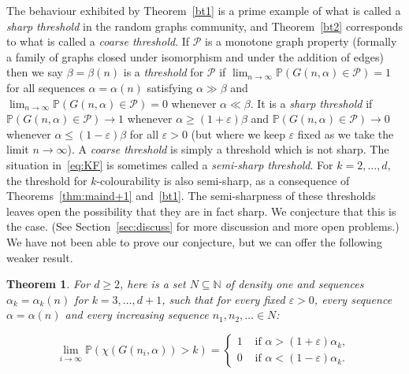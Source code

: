 \documentclass[11pt]{article}%
\newtheorem{theorem}{Theorem} %
\newcommand{\Pcal}[0]{\ensuremath{{\mathcal P}}}
\newcommand{\eN}[0]{\ensuremath{ \mathbb N}}
\newcommand{\Pee}[0]{\ensuremath{{\mathbb P}}}
\newcommand{\eps}{\varepsilon}
\begin{document}
The behaviour exhibited by Theorem~\ref{bt1} is a prime example of what is called a {\em sharp threshold} in the 
random graphs community, and Theorem~\ref{bt2} corresponds to what is called a {\em coarse threshold}.
If $\Pcal$ is a monotone graph property (formally a family of graphs closed under isomorphism and under the 
addition of edges) then we say $\beta = \beta(n)$ is a {\em threshold} for $\Pcal$ if
$\lim_{n\to\infty}\Pee( G(n,\alpha) \in \Pcal ) = 1$ for all sequences $\alpha=\alpha(n)$ 
satisfying $\alpha \gg \beta$ and 
$\lim_{n\to\infty}\Pee( G(n,\alpha) \in \Pcal ) = 0$ whenever $\alpha \ll \beta$. It is a 
{\em sharp threshold} if $\Pee( G(n,\alpha) \in \Pcal ) \to 1$ whenever $\alpha \geq (1+\eps) \beta$ and 
$\Pee( G(n,\alpha) \in \Pcal ) \to 0$ whenever $\alpha \leq (1-\eps)\beta$ for all $\eps>0$ 
(but where we keep $\eps$ fixed as we take the limit $n\to\infty$).
A {\em coarse threshold} is simply a threshold which is not sharp.
The situation in~\eqref{eq:KF} is sometimes called a {\em semi-sharp threshold}.
For $k=2,\dots,d$, the threshold for $k$-colourability is also semi-sharp, as a 
consequence of Theorems~\ref{thm:maind+1} and~\ref{bt1}.
The semi-sharpness of these thresholds leaves open the possibility that they are in fact sharp.
We conjecture that this is the case. 
(See Section~\ref{sec:discuss} for more discussion and more open problems.)
We have not been able to prove our conjecture, but we can offer the following weaker result.


\begin{theorem}\label{thm:main}
 For $d\geq 2$, here is a set $N \subseteq \eN$ of density one and 
 sequences $\alpha_k = \alpha_k(n)$ for $k=3,\dots,d+1$, such that for every fixed $\eps>0$, 
 every sequence $\alpha=\alpha(n)$ and every increasing sequence $n_1,n_2,\dots \in N$: 
 
 $$ \lim_{i\to\infty} \Pee\left( \chi\left( G(n_i,\alpha) \right) > k \right) =
 \begin{cases}
 1 & \text{ if $\alpha > (1+\eps)\alpha_k$, } \\
 0 & \text{ if $\alpha < (1-\eps)\alpha_k$. }
 \end{cases} $$
 
\end{theorem}
\end{document}
